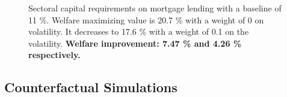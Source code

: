 \documentclass[12pt]{article}
\numberwithin{equation}{section}
\begin{document}
\begin{figure}[H]
\centering
\caption{Sectoral capital requirements on mortgage lending with a baseline of 11 \%. Welfare maximizing value is 20.7 \% with a weight of 0 on volatility. It decreases to 17.6 \% with a weight of 0.1 on the volatility.
\label{optimalPrud_fig}
\textbf{Welfare improvement: 7.47 \% and 4.26 \% respectively.} } 
\end{figure}





\subsection{Counterfactual Simulations}
\end{document}
